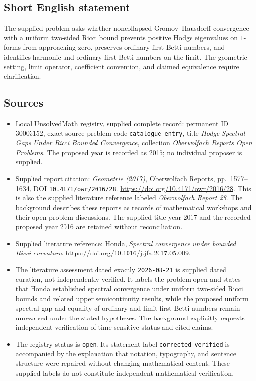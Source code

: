 \documentclass[11pt]{article}
\begin{document}
\subsection{Short English statement}
The supplied problem asks whether noncollapsed Gromov--Hausdorff convergence with a uniform two-sided Ricci bound prevents positive Hodge eigenvalues on \(1\)-forms from approaching zero, preserves ordinary first Betti numbers, and identifies harmonic and ordinary first Betti numbers on the limit. The geometric setting, limit operator, coefficient convention, and claimed equivalence require clarification.
\subsection{Sources}
\begin{itemize}
\item Local UnsolvedMath registry, supplied complete record: permanent ID \(30003152\), exact source problem code \texttt{catalogue entry}, title \emph{Hodge Spectral Gaps Under Ricci Bounded Convergence}, collection \emph{Oberwolfach Reports Open Problems}. The proposed year is recorded as 2016; no individual proposer is supplied.
\item Supplied report citation: \emph{Geometrie (2017)}, Oberwolfach Reports, pp.~1577--1634, DOI \texttt{10.4171/owr/2016/28}. \url{https://doi.org/10.4171/owr/2016/28}. This is also the supplied literature reference labeled \emph{Oberwolfach Report 28}. The background describes these reports as records of mathematical workshops and their open-problem discussions. The supplied title year 2017 and the recorded proposed year 2016 are retained without reconciliation.
\item Supplied literature reference: Honda, \emph{Spectral convergence under bounded Ricci curvature}. \url{https://doi.org/10.1016/j.jfa.2017.05.009}.
\item The literature assessment dated exactly \texttt{2026-08-21} is supplied dated curation, not independently verified. It labels the problem open and states that Honda established spectral convergence under uniform two-sided Ricci bounds and related upper semicontinuity results, while the proposed uniform spectral gap and equality of ordinary and limit first Betti numbers remain unresolved under the stated hypotheses. The background explicitly requests independent verification of time-sensitive status and cited claims.
\item The registry status is \texttt{open}. Its statement label \texttt{corrected\_verified} is accompanied by the explanation that notation, typography, and sentence structure were repaired without changing mathematical content. These supplied labels do not constitute independent mathematical verification.
\end{itemize}
\end{document}
